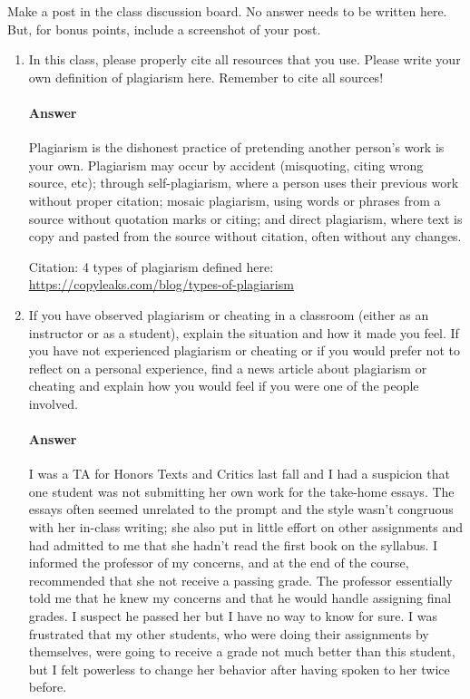 \documentclass{article}
\begin{document}

Make a post in the class discussion board. No answer needs to be written here.
But, for bonus points, include a screenshot of your post.



\begin{enumerate}

    \item In this class, please properly cite all resources that you use. Please
        write your own definition of plagiarism here.  Remember to cite all
        sources!

        \paragraph{Answer}{Plagiarism is the dishonest practice of pretending another person's work is your own. Plagiarism may occur by accident (misquoting, citing wrong source, etc); through self-plagiarism, where a person uses their previous work without proper citation; mosaic plagiarism, using words or phrases from a source without quotation marks or citing; and direct plagiarism, where text is copy and pasted from the source without citation, often without any changes.} 

Citation: 4 types of plagiarism defined here: \url{https://copyleaks.com/blog/types-of-plagiarism}


    \item If you have observed plagiarism or cheating in a classroom (either as
        an instructor or as a student), explain the situation and how it made
        you feel.  If you have not experienced plagiarism or cheating or if you
        would prefer not to reflect on a personal experience, find a news
        article about plagiarism or cheating and explain how you would feel if
        you were one of the people involved.

        \paragraph{Answer}{I was a TA for Honors Texts and Critics last fall and I had a suspicion that one student was not submitting her own work for the take-home essays. The essays often seemed unrelated to the prompt and the style wasn't congruous with her in-class writing; she also put in little effort on other assignments and had admitted to me that she hadn't read the first book on the syllabus. I informed the professor of my concerns, and at the end of the course, recommended that she not receive a passing grade. The professor essentially told me that he knew my concerns and that he would handle assigning final grades. I suspect he passed her but I have no way to know for sure. I was frustrated that my other students, who were doing their assignments by themselves, were going to receive a grade not much better than this student, but I felt powerless to change her behavior after having spoken to her twice before.}
\end{enumerate}
\end{document}
